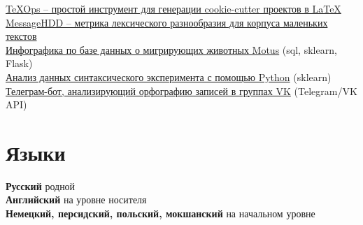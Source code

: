 \documentclass[11pt]{article} %
\begin{document}
\href{https://github.com/thddbptnsndshs/texops}{TeXOps -- простой инструмент для генерации cookie-cutter проектов в LaTeX}\\
\href{https://github.com/thddbptnsndshs/MessageHDD}{MessageHDD -- метрика лексического разнообразия для корпуса маленьких текстов}\\
\href{https://github.com/thddbptnsndshs/motustoday}{Инфографика по базе данных о мигрирующих животных Motus} (sql, sklearn, Flask)\\
\href{https://github.com/thddbptnsndshs/idioms}{Анализ данных синтаксического эксперимента с помощью Python} (sklearn)\\
\href{https://github.com/thddbptnsndshs/nlzlkskprdstvtljsclnhgrppncnvfrmvgrppvk}{Телеграм-бот, анализирующий орфографию записей в группах VK} (Telegram/VK API)\\

\section*{Языки}

\textbf{Русский} родной\\
\textbf{Английский} на уровне носителя\\
\textbf{Немецкий, персидский, польский, мокшанский} на начальном уровне




\end{document}
